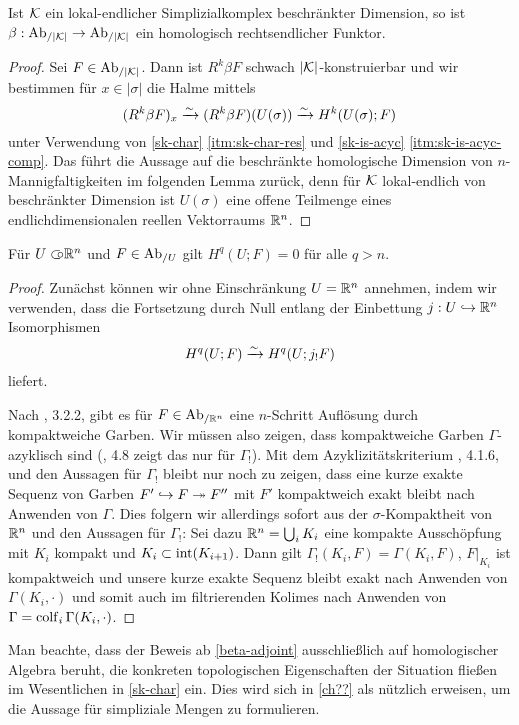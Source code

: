 \begin{lemma}
  Ist $\mathcal{K}$ ein lokal-endlicher Simplizialkomplex beschränkter
  Dimension, so ist $\beta: \operatorname{Ab}_{/|\mathcal{K}|} \to \operatorname{Ab}_{/|\mathcal{K}|}$ ein homologisch
  rechtsendlicher Funktor.

\end{lemma}


\begin{proof}
  Sei $F \in \operatorname{Ab}_{/|\mathcal{K}|}$. Dann ist $R^k \beta F$ schwach
  $|\mathcal{K}|$-konstruierbar und wir bestimmen für $x \in |\sigma|$ die
  Halme mittels
  \[ (R^k \beta F)_x \xrightarrow[]{\sim} (R^k \beta F)(U(\sigma)) \xrightarrow[]{\sim} H^k(U(\sigma); F) \]
  unter Verwendung von \ref{sk-char} \ref{itm:sk-char-res} und
  \ref{sk-is-acyc} \ref{itm:sk-is-acyc-comp}. Das führt die Aussage
  auf die beschränkte homologische Dimension von
  $n$-Mannigfaltigkeiten im folgenden Lemma zurück, denn für $\mathcal{K}$
  lokal-endlich von beschränkter Dimension ist $U(\sigma)$ eine offene
  Teilmenge eines endlichdimensionalen reellen Vektorraums $\mathbb{R}^n$.
\end{proof}
\begin{lemma}
  Für $U \subset\kern-0.58em\circ \mathbb{R}^n$ und $F \in \operatorname{Ab}_{/U}$ gilt $H^q(U; F) = 0$ für
  alle $q > n$.
\end{lemma}
\begin{proof}
  Zunächst können wir ohne Einschränkung $U = \mathbb{R}^n$ annehmen, indem
  wir verwenden, dass die Fortsetzung durch Null entlang der
  Einbettung $j: U \hookrightarrow \mathbb{R}^n$ Isomorphismen
  \[ H^q(U; F) \xrightarrow[]{\sim} H^q(U; j_! F) \]
  liefert.

  Nach \cite{KS}, 3.2.2, gibt es für $F \in \operatorname{Ab}_{/\mathbb{R}^n}$ eine
  $n$-Schritt Auflösung durch kompaktweiche Garben. Wir müssen also
  zeigen, dass kompaktweiche Garben $\Gamma$-azyklisch sind
  (\cite{TG}, 4.8 zeigt das nur für $\Gamma_!$). Mit dem
  Azyklizitätskriterium \cite{TG}, 4.1.6, und den Aussagen für
  $\Gamma_!$ bleibt nur noch zu zeigen, dass eine kurze exakte Sequenz
  von Garben $F' \hookrightarrow F \twoheadrightarrow F''$ mit $F'$ kompaktweich exakt bleibt
  nach Anwenden von $\Gamma$. Dies folgern wir allerdings sofort aus
  der $\sigma$-Kompaktheit von $\mathbb{R}^n$ und den Aussagen für $\Gamma_!$:
  Sei dazu $\mathbb{R}^n = \bigcup_i K_i$ eine kompakte Ausschöpfung mit $K_i$
  kompakt und $K_i \subset \operatorname{int}(K_{i+1})$. Dann gilt $\Gamma_!(K_i,
  F) = \Gamma(K_i, F)$, $F|_{K_i}$ ist kompaktweich und unsere kurze
  exakte Sequenz bleibt exakt nach Anwenden von $\Gamma(K_i, \cdot)$
  und somit auch im filtrierenden Kolimes nach Anwenden von $\Gamma =
  \operatorname{colf}_i \Gamma(K_i, \cdot)$.
\end{proof}
\begin{bem} \label{sk-homalg}
  Man beachte, dass der Beweis ab \ref{beta-adjoint} ausschließlich
  auf homologischer Algebra beruht, die konkreten topologischen
  Eigenschaften der Situation fließen im Wesentlichen in \ref{sk-char}
  ein. Dies wird sich in \ref{ch??} als nützlich erweisen, um die
  Aussage für simpliziale Mengen zu formulieren.
\end{bem}

